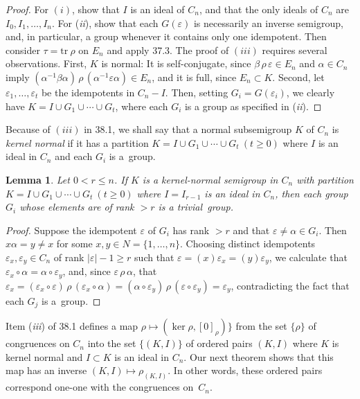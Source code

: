 \documentclass{surv-l}
\numberwithin{equation}{section}
\numberwithin{table}{section}
\numberwithin{figure}{section}
\theoremstyle{plain}
\newtheorem{lemma}[equation]{Lemma}
\theoremstyle{definition}
\begin{document}
\begin{proof} For $(i)$, show that $I$ is an ideal of $C_{n}$, and that the
only ideals of $C_{n}$ are $I_{0}, I_{1},\ldots, I_{n}$. For
(\emph{ii}), show that each $G(\varepsilon)$ is necessarily an
inverse semigroup, and, in particular, a group whenever it
contains only one idempotent. Then consider $\tau = \mathrm{tr}
\ \rho$ on $E_{n}$ and apply 37.3. The proof of $(iii)$ requires
several observations. First, $K$ is normal: It is self-conjugate,
since $\beta\,\rho\,\varepsilon\in E_{n}$ and $\alpha\in C_{n}$ imply
$(\alpha^{-1}\beta\alpha)\,\rho\,(\alpha^{-1}\varepsilon\alpha)\in
E_{n}$, and it is full, since $E_{n}\subset K$. Second, let
$\varepsilon_{1},\ldots, \varepsilon_{t}$ be the idempotents in
$C_{n}- I$. Then, setting $G_{i}=G(\varepsilon_{i})$, we clearly
have $K=I\cup G_{1}\cup\cdots\cup G_{t}$, where each $G_{i}$ is a
group as specified in (\emph{ii}).
\end{proof}

Because of $(iii)$ in 38.1, we shall say that a normal
subsemigroup $K$ of $C_{n}$ is \emph{kernel normal} if it has a
partition $K=I \cup G_{1}\cup\cdots\cup G_{t}\ (t\geq 0)$ where $I$ is
an ideal in $C_{n}$ and each $G_{i}$ is a~group.

\begin{lemma}\label{8.38.2}
Let $0<r\leq n$. If $K$ is a kernel-normal semigroup in $C_{n}$
with partition $K=I \cup G_{1}\cup\cdots\cup G_{t}\ (t\geq 0)$ where
$I =I_{r-1}$ is an ideal in $C_{n}$, then each group $G_{i}$ whose
elements are of rank $>r$ is a trivial~group.
\end{lemma}

\begin{proof} Suppose the idempotent $\varepsilon$ of $G_{i}$ has rank $>r$
and that $\varepsilon \neq\alpha\in G_{i}$. Then $x\alpha=y \neq
x$ for some $x, y\in N=\{1,\ldots, n\}$. Choosing distinct
idempotents $\varepsilon_{x}, \varepsilon_{y}\in C_{n}$ of rank
$|\varepsilon|-1\geq r$ such that
$\varepsilon=(x)\varepsilon_{x}=(y)\varepsilon_{y}$, we calculate
that $\varepsilon_{x}\circ\alpha=\alpha\circ\varepsilon_{y}$, and,
since $\varepsilon\,\rho\,\alpha$, that
$\varepsilon_{x}=(\varepsilon_{x}\circ
\varepsilon)\,\rho\,(\varepsilon_{x}\circ \alpha)
=(\alpha\circ\varepsilon_{y})\,\rho\,(\varepsilon
\circ\varepsilon_{y})=\varepsilon_{y}$, contradicting the fact that
each $G_{j}$ is a~group.
\end{proof}

Item (\emph{iii}) of 38.1 defines a map $\rho\mapsto(\ker \rho, [0]_{\rho})\}$ from the set $\{\rho\}$ of congruences on
$C_{n}$ into the set $\{(K,I)\}$ of ordered pairs $(K, I)$ where
$K$ is kernel normal and $I \subset K$ is an ideal in $C_{n}$. Our
next theorem shows that this map has an inverse $(K, I)
\mapsto\rho_{(K,I)}$. In other words, these ordered pairs
correspond one-one with the congruences on~$C_{n}$.
\end{document}
